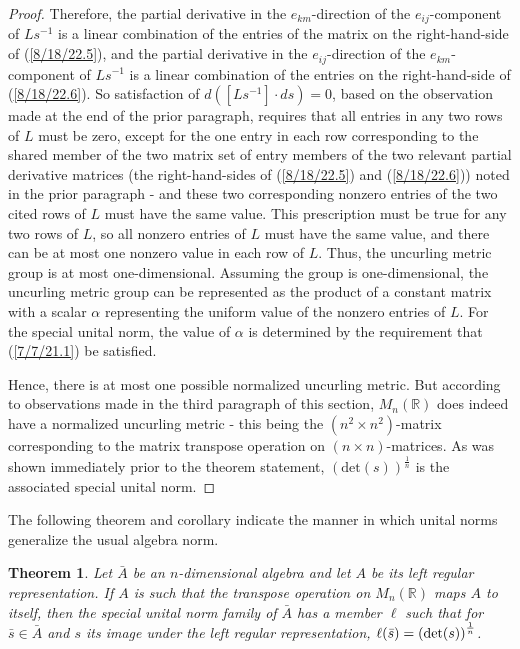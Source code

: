 \documentclass{amsart}
\numberwithin{equation}{section}
\newtheorem{theorem}{Theorem}
\theoremstyle{definition}
\numberwithin{theorem}{section}
\begin{document}
\begin{proof}
Therefore, the partial derivative in the $e_{km}$-direction of the $e_{ij}$-component of $Ls^{-1}$ is a linear combination of the entries of the matrix on the right-hand-side of (\ref{8/18/22.5}), and  the partial derivative in the $e_{ij}$-direction of the $e_{km}$-component of $Ls^{-1}$ is a linear combination of the entries on the right-hand-side of (\ref{8/18/22.6}).
So satisfaction of $d\left([Ls^{-1}]\cdot ds\right) = 0$, based on the observation made at the end of the prior paragraph, requires that all entries in any two rows of $L$ must be zero, except for the one entry in each row corresponding to the shared member of the two matrix set of entry members of the two relevant partial derivative matrices (the right-hand-sides of (\ref{8/18/22.5}) and (\ref{8/18/22.6})) noted in the prior paragraph - and these two corresponding nonzero entries of the two cited rows of $L$ must have the same value.  This prescription must be true for any two rows of $L$, so all nonzero entries of $L$ must have the same value, and there can be at most one nonzero value in each row of $L$.  Thus, the uncurling metric group is at most one-dimensional. Assuming the group is one-dimensional, the uncurling metric group can be represented as the product of a constant matrix with a scalar $\alpha$ representing the uniform value of the nonzero entries of $L$.  
For the special unital norm, the value of $\alpha$ is determined by the requirement that (\ref{7/7/21.1}) be satisfied. 

Hence, there is at most one possible normalized uncurling metric.  But according to observations made in the third paragraph of this section, $ M_n(\mathbb{R})$ does indeed have a normalized uncurling metric - this being the $(n^2\times n^2)$-matrix corresponding to the matrix transpose operation on $(n\times n)$-matrices.  As was shown immediately prior to the theorem statement, $(\mbox{det}(s))^{\frac{1}{n}}$ is the associated special unital norm.  
 \end{proof}
 
 The following theorem and corollary indicate the manner in which unital norms generalize the usual algebra norm.
 
 \begin{theorem}\label{5/13/22.1} Let $\bar{A}$ be an $n$-dimensional algebra and let $A$ be its left regular representation.  If $A$ is such that the transpose operation on $ M_n(\mathbb{R})$ maps $A$ to itself, then the special unital norm family of $\bar{A}$ has a member $\ell$ such that  for $\bar{s}\in\bar{A}$ and $s$ its image under the left regular representation, $\ell(\bar{s}) = \left({\rm det}(s)\right)^{\frac{1}{n}}$. 
\end{theorem}
\end{document}
